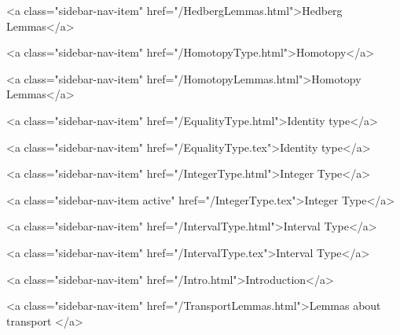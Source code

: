           <a class="sidebar-nav-item" href="/HedbergLemmas.html">Hedberg Lemmas</a>
        
      
    
      
        
          <a class="sidebar-nav-item" href="/HomotopyType.html">Homotopy</a>
        
      
    
      
        
          <a class="sidebar-nav-item" href="/HomotopyLemmas.html">Homotopy Lemmas</a>
        
      
    
      
        
          <a class="sidebar-nav-item" href="/EqualityType.html">Identity type</a>
        
      
    
      
        
          <a class="sidebar-nav-item" href="/EqualityType.tex">Identity type</a>
        
      
    
      
        
          <a class="sidebar-nav-item" href="/IntegerType.html">Integer Type</a>
        
      
    
      
        
          <a class="sidebar-nav-item active" href="/IntegerType.tex">Integer Type</a>
        
      
    
      
        
          <a class="sidebar-nav-item" href="/IntervalType.html">Interval Type</a>
        
      
    
      
        
          <a class="sidebar-nav-item" href="/IntervalType.tex">Interval Type</a>
        
      
    
      
        
          <a class="sidebar-nav-item" href="/Intro.html">Introduction</a>
        
      
    
      
        
          <a class="sidebar-nav-item" href="/TransportLemmas.html">Lemmas about transport </a>
        
      
    
      
        

